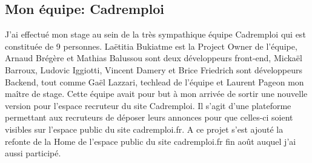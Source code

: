 \subsection{Mon équipe: Cadremploi}
\label{sub:Mon équipe}
J'ai effectué mon stage au sein de la très sympathique équipe Cadremploi qui est constituée de 9 personnes. Laëtitia Bukiatme est la Project Owner de l'équipe, Arnaud Brégère et Mathias Balussou sont deux développeurs front-end, Mickaël Barroux, Ludovic Iggiotti, Vincent Damery et Brice Friedrich sont développeurs Backend, tout comme Gaël Lazzari, techlead de l'équipe et Laurent Pageon mon maître de stage.
Cette équipe avait pour but à mon arrivée de sortir une nouvelle version pour l'espace recruteur du site Cadremploi.
Il s'agit d'une plateforme permettant aux recruteurs de déposer leurs annonces pour que celles-ci soient visibles sur l'espace public du site cadremploi.fr.
A ce projet s'est ajouté la refonte de la Home de l'espace public du site cadremploi.fr fin août auquel j'ai aussi participé.
